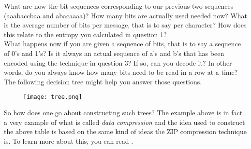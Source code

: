 {\begin{minipage}{43em}
What are now the bit sequences corresponding to our previous two sequences (aaabaccbaa and abacaaaa)? How many bits are actually used needed now? What is the average number of bits per message, that is to say per character? How does this relate to the entropy you calculated in question 1? \\

What happens now if you are given a sequence of bits, that is to say a sequence of 0's and 1's? Is it always an actual sequence of a's and b's that has been encoded using the technique in question 3? If so, can you decode it? In other words, do you always know how many bits need to be read in a row at a time? The following decision tree might help you answer those questions.
\begin{figure}[H]
   \centering
   \texttt{[image: tree.png]} 
\end{figure}
\end{minipage}} \vspace{0.2cm}

So how does one go about constructing such trees? The example above is in fact a very example of what is called \emph{data compression} and the idea used to construct the above table is based on the same kind of ideas the ZIP compression technique is. To learn more about this, you can read .















